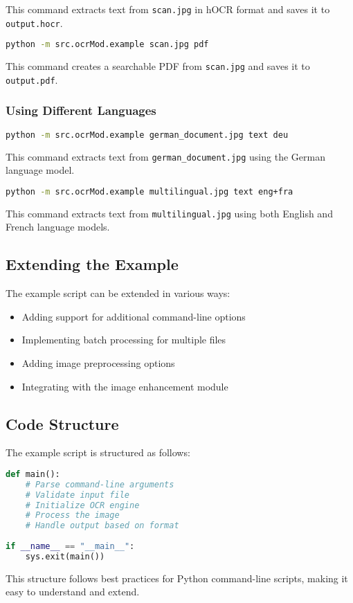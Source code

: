 This command extracts text from \texttt{scan.jpg} in hOCR format and saves it to \texttt{output.hocr}.

\begin{lstlisting}[language=bash]
python -m src.ocrMod.example scan.jpg pdf
\end{lstlisting}

This command creates a searchable PDF from \texttt{scan.jpg} and saves it to \texttt{output.pdf}.

\subsubsection{Using Different Languages}

\begin{lstlisting}[language=bash]
python -m src.ocrMod.example german_document.jpg text deu
\end{lstlisting}

This command extracts text from \texttt{german\_document.jpg} using the German language model.

\begin{lstlisting}[language=bash]
python -m src.ocrMod.example multilingual.jpg text eng+fra
\end{lstlisting}

This command extracts text from \texttt{multilingual.jpg} using both English and French language models.

\subsection{Extending the Example}

The example script can be extended in various ways:

\begin{itemize}
  \item Adding support for additional command-line options
  \item Implementing batch processing for multiple files
  \item Adding image preprocessing options
  \item Integrating with the image enhancement module
\end{itemize}

\subsection{Code Structure}

The example script is structured as follows:

\begin{lstlisting}[language=Python]
def main():
    # Parse command-line arguments
    # Validate input file
    # Initialize OCR engine
    # Process the image
    # Handle output based on format
    
if __name__ == "__main__":
    sys.exit(main())
\end{lstlisting}

This structure follows best practices for Python command-line scripts, making it easy to understand and extend. 